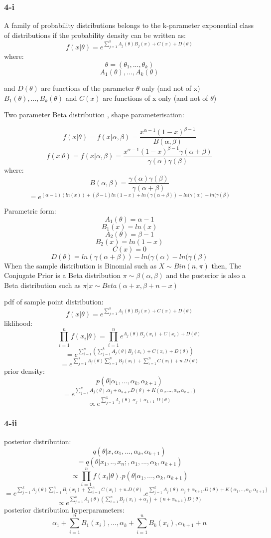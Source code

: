 \documentclass[]{article}
\begin{document}
\subsubsection{4-i}\label{i-1}

A family of probability distributions belongs to the k-parameter
exponential class of distributions if the probability density can be
written as:
\[f(x|\theta) = e^{\sum_{j=1}^kA_j(\theta)B_j(x)+C(x)+D(\theta)}\]
where: \[\theta = (\theta_1,...,\theta_k)\]
\[A_1(\theta),...,A_k(\theta) \]

and \(D(\theta)\) are functions of the parameter \(\theta\) only (and
not of x) \(B_1(\theta),...,B_k(\theta)\) and \(C(x)\) are functions of
x only (and not of \(\theta\))

Two parameter Beta distribution , shape parameterisation:

\[f(x|\theta) = f(x|\alpha,\beta) = \frac{x^{\alpha-1}(1-x)^{\beta-1}}{B(\alpha,\beta)}\]
\[f(x|\theta) = f(x|\alpha,\beta) = \frac{x^{\alpha-1}(1-x)^{\beta-1}{\gamma(\alpha+\beta)}}{{\gamma(\alpha)\gamma(\beta)}} \]
where:
\[B(\alpha,\beta) = \frac{\gamma(\alpha)\gamma(\beta)}{\gamma(\alpha+\beta)} \]
\[= e^{(\alpha-1)(ln(x))+(\beta-1)ln(1-x)+ln(\gamma(\alpha+\beta))-ln(\gamma(\alpha)-ln(\gamma(\beta)}\]

Parametric form: \[A_1(\theta) = \alpha-1 \] \[B_1(x) = ln(x) \]
\[A_2(\theta) = \beta-1 \] \[B_2(x) = ln(1-x) \] \[C(x) = 0 \]
\[D(\theta) = ln(\gamma(\alpha+\beta))-ln(\gamma(\alpha)-ln(\gamma(\beta)\]
When the sample distribution is Binomial such as \(X \sim Bin(n,\pi)\)
then, The Conjugate Prior is a Beta distribution
\(\pi \sim \beta(\alpha,\beta)\) and the posterior is also a Beta
distribution such as \(\pi|x \sim Beta(\alpha+x,\beta+n-x)\)

pdf of sample point distribution: \[
f(x|\theta) = e^{\sum_{j=1}^kA_j(\theta)B_j(x)+C(x)+D(\theta)}
\] liklihood:
\[\prod_{i=1}^nf(x_i|\theta) = \prod_{i=1}^ne^{A_j(\theta)B_j(x_i)+C(x_i)+D(\theta)} \]
\[= e^{\sum_{i=1}^n(\sum_{j=1}^kA_j(\theta)B_j(x_i)+C(x_i)+D(\theta))} \]
\[= e^{\sum_{j=1}^kA_j(\theta)\sum_{i=1}^nB_j(x_i)+\sum_{i=1}^nC(x_i)+n.D(\theta)}\]
prior density: \[p(\theta|\alpha_1,...,\alpha_k,\alpha_{k+1})\]
\[= e^{\sum_{j=1}^kA_j(\theta).\alpha_j+\alpha_{k+1}.D(\theta)+K(\alpha_1,...,\alpha_k,\alpha_{k+1})}\]
\[\propto e^{\sum_{j=1}^kA_j(\theta).\alpha_j+\alpha_{k+1}.D(\theta)}\]

\subsubsection{4-ii}\label{ii-1}

posterior distribution:
\[q(\theta|x,\alpha_1,...,\alpha_k,\alpha_{k+1})\]
\[= q(\theta|x_1,..,x_n;,\alpha_1,...,\alpha_k,\alpha_{k+1}) \]
\[\propto \prod_{i=1}^nf(x_i|\theta).p(\theta|\alpha_1,...,\alpha_k,\alpha_{k+1}) \]
\[= e^{\sum_{j=1}^kA_j(\theta)\sum_{i=1}^nB_j(x_i)+\sum_{i=1}^nC(x_i)+n.D(\theta)}.e^{\sum_{j=1}^kA_j(\theta).\alpha_j+\alpha_{k+1}.D(\theta)+K(\alpha_1,..,\alpha_k,\alpha_{k+1})}\]
\[\propto e^{\sum_{j=1}^kA_j(\theta)(\sum_{i=1}^nB_j(x_i)+\alpha_j)+(n+\alpha_{k+1})D(\theta)}\]
posterior distribution hyperparameters:
\[\alpha_1 + \sum_{i=1}^nB_1(x_i),...,\alpha_k + \sum_{i=1}^nB_k(x_i),\alpha_{k+1}+n\]
\end{document}
